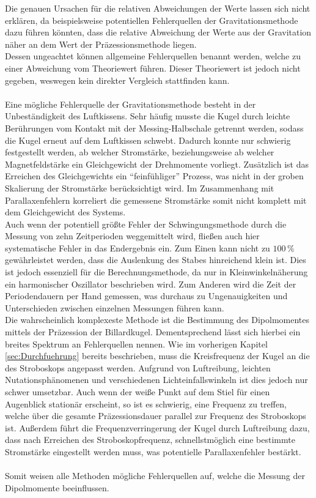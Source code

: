 \noindent Die genauen Ursachen für die relativen Abweichungen der Werte lassen sich nicht erklären, da beispielsweise 
potentiellen Fehlerquellen der Gravitationsmethode dazu führen könnten, dass die relative Abweichung der Werte aus der 
Gravitation näher an dem Wert der Präzessionsmethode liegen. \\
Dessen ungeachtet können allgemeine Fehlerquellen benannt werden, welche zu einer Abweichung vom Theoriewert führen. Dieser 
Theoriewert ist jedoch nicht gegeben, weswegen kein direkter Vergleich stattfinden kann.\\\\
Eine mögliche Fehlerquelle der Gravitationsmethode besteht in der Unbeständigkeit des Luftkissens. Sehr häufig musste 
die Kugel durch leichte Berührungen vom Kontakt mit der Messing-Halbschale getrennt werden, sodass die Kugel erneut 
auf dem Luftkissen schwebt. Dadurch konnte nur schwierig festgestellt werden, ab welcher Stromstärke, beziehungsweise ab 
welcher Magnetfeldstärke ein Gleichgewicht der Drehmomente vorliegt. Zusätzlich ist das Erreichen des Gleichgewichts 
ein \enquote{feinfühliger} Prozess, was nicht in der groben Skalierung der Stromstärke berücksichtigt wird. Im Zusammenhang 
mit Parallaxenfehlern korreliert die gemessene Stromstärke somit nicht komplett mit dem Gleichgewicht des Systems.\\
Auch wenn der potentiell größte Fehler der Schwingungsmethode durch die Messung von zehn Zeitperioden weggemittelt wird,
fließen auch hier systematische Fehler in das Endergebnis ein. Zum Einen kann nicht zu $100\,\unit{\percent}$ 
gewährleistet werden, dass die Auslenkung des Stabes hinreichend klein ist. Dies ist jedoch essenziell für die 
Berechnungsmethode, da nur in Kleinwinkelnäherung ein harmonischer Oszillator beschrieben wird. Zum Anderen wird die Zeit 
der Periodendauern per Hand gemessen, was durchaus zu Ungenauigkeiten und Unterschieden zwischen einzelnen Messungen 
führen kann. \\
Die wahrscheinlich komplexeste Methode ist die Bestimmung des Dipolmomentes mittels der Präzession der Billardkugel.
Dementsprechend lässt sich hierbei ein breites Spektrum an Fehlerquellen nennen. Wie im vorherigen Kapitel \ref{sec:Durchfuehrung}
bereits beschrieben, muss die Kreisfrequenz der Kugel an die des Stroboskops angepasst werden. Aufgrund von Luftreibung,
leichten Nutationsphänomenen und verschiedenen Lichteinfallswinkeln ist dies jedoch nur schwer umsetzbar. Auch wenn der weiße
Punkt auf dem Stiel für einen Augenblick stationär erscheint, so ist es schwierig, eine Frequenz zu treffen, welche über 
die gesamte Präzessionsdauer parallel zur Frequenz des Stroboskops ist. Außerdem führt die Frequenzverringerung der Kugel 
durch Luftreibung dazu, dass nach Erreichen des Stroboskopfrequenz, schnellstmöglich eine bestimmte Stromstärke eingestellt werden 
muss, was potentielle Parallaxenfehler bestärkt. \\\\
Somit weisen alle Methoden mögliche Fehlerquellen auf, welche die Messung der Dipolmomente beeinflussen.

%
